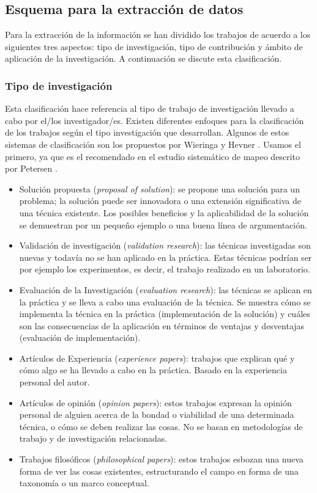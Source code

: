 \subsection{Esquema para la extracción de datos}

Para la extracción de la información se han dividido los trabajos de acuerdo a los siguientes tres aspectos: tipo de investigación, tipo de contribución y ámbito de aplicación de la investigación. A continuación se discute esta clasificación.

\subsubsection{Tipo de investigación}
Esta clasificación hace referencia al tipo de trabajo de investigación llevado a cabo por el/los investigador/es. Existen diferentes enfoques para la clasificación de los trabajos según el tipo investigación que desarrollan. Algunos de estos sistemas de clasificación son los propuestos por Wieringa \cite{Wieringa:2005} y Hevner \cite{Hevner:2004}. Usamos el primero, ya que es el recomendado en el estudio sistemático de mapeo descrito por Petersen \cite{Petersen:2008}.
\begin{itemize}
\item Solución propuesta (\emph{proposal of solution}): se propone una solución para un problema; la solución puede ser innovadora o una extensión significativa de una técnica existente. Los posibles beneficios y la aplicabilidad de la solución se demuestran por un pequeño ejemplo o una buena línea de argumentación.
\item Validación de investigación (\emph{validation research}): las técnicas investigadas son nuevas y todavía no se han aplicado en la práctica. Estas técnicas podrían ser por ejemplo los experimentos, es decir, el trabajo realizado en un laboratorio.
\item Evaluación de la Investigación (\emph{evaluation research}): las técnicas se aplican en la práctica y se lleva a cabo una evaluación de la técnica. Se muestra cómo se implementa la técnica en la práctica (implementación de la solución) y cuáles son las consecuencias de la aplicación en términos de ventajas y desventajas (evaluación de implementación).
\item Artículos de Experiencia (\emph{experience papers}): trabajos que explican qué y cómo algo se ha llevado a cabo en la práctica. Basado en la experiencia personal del autor.
\item Artículos de opinión (\emph{opinion papers}): estos trabajos expresan la opinión personal de alguien acerca de la bondad o viabilidad de una determinada técnica, o cómo se deben realizar las cosas. No se basan en metodologías de trabajo y de investigación relacionadas.
\item Trabajos filosóficos (\emph{philosophical papers}): estos trabajos esbozan una nueva forma de ver las cosas existentes, estructurando el campo en forma de una taxonomía o un marco conceptual.
\end{itemize}

